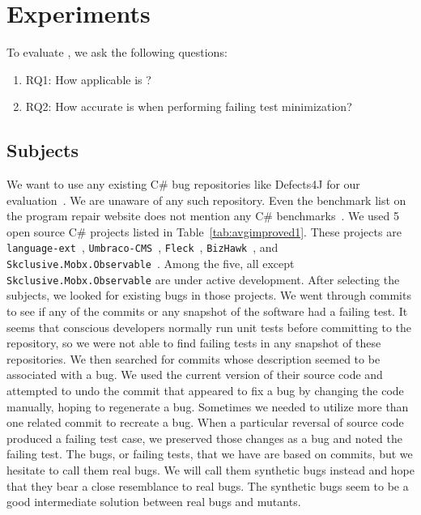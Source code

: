 \clearpage %

\chapter{Experiments}\label{CH5_Experiments}


To evaluate \mytool, we ask the following questions: 
\begin{enumerate}
    \item RQ1: How applicable is \mytool?
    \item RQ2: How accurate is \mytool when performing failing test minimization?
\end{enumerate}

\section{Subjects}
We want to use any existing C\# bug repositories like Defects4J for our evaluation~\cite{just2014defects4j}. We are unaware of any such repository. Even the benchmark list on the program repair website does not mention any C\# benchmarks~\cite{aprbenchmarks}. We used 5 open source C\# projects listed in Table~\ref{tab:avgimproved1}. These projects are \texttt{language-ext}~\cite{louth}, \texttt{Umbraco-CMS}~\cite{deminick}, \texttt{Fleck}~\cite{staten}, \texttt{BizHawk}~\cite{adelikat}, and \texttt{Skclusive.Mobx.Observable}~\cite{skclusive}. Among the five, all except \texttt{Skclusive.Mobx.Observable} are under active development.   
After selecting the subjects, we looked for existing bugs in those projects. We went through commits to see if any of the commits or any snapshot of the software had a failing test. It seems that conscious developers normally run unit tests before committing to the repository, so we were not able to find failing tests in any snapshot of these repositories. We then searched for commits whose description seemed to be associated with a bug. We used the current version of their source code and attempted to undo the commit that appeared to fix a bug by changing the code manually, hoping to regenerate a bug. Sometimes we needed to utilize more than one related commit to recreate a bug. When a particular reversal of source code produced a failing test case, we preserved those changes as a bug and noted the failing test. The bugs, or failing tests, that we have are based on commits, but we hesitate to call them real bugs. We will call them synthetic bugs instead and hope that they bear a close resemblance to real bugs. The synthetic bugs seem to be a good intermediate solution between real bugs and mutants. 

